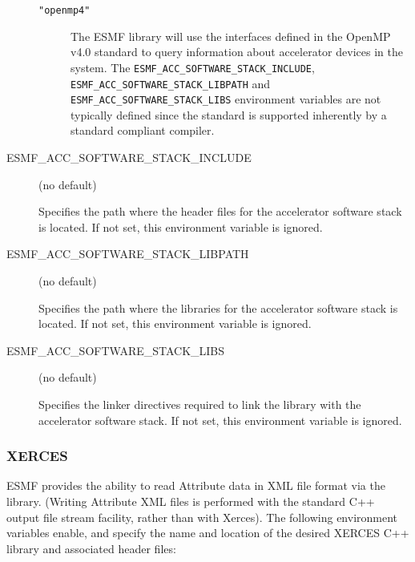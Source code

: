 \begin{description}
\begin{description}
\item[{\tt "openmp4"}] The ESMF library will use the interfaces defined
in the OpenMP v4.0 standard to query information about accelerator devices
in the system.
The {\tt ESMF\_ACC\_SOFTWARE\_STACK\_INCLUDE},
{\tt ESMF\_ACC\_SOFTWARE\_STACK\_LIBPATH} and
{\tt ESMF\_ACC\_SOFTWARE\_STACK\_LIBS} environment variables are not typically
defined since the standard is supported inherently by a standard compliant
compiler.

\end{description}

\item[ESMF\_ACC\_SOFTWARE\_STACK\_INCLUDE] (no default)

Specifies the path where the header files for the accelerator software
stack is located. If not set, this environment variable is ignored.

\item[ESMF\_ACC\_SOFTWARE\_STACK\_LIBPATH] (no default)

Specifies the path where the libraries for the accelerator software
stack is located. If not set, this environment variable is ignored.

\item[ESMF\_ACC\_SOFTWARE\_STACK\_LIBS] (no default)

Specifies the linker directives required to link the library with
the accelerator software stack. If not set, this environment variable
is ignored.

\end{description}


\subsubsection{XERCES}
\label{sec:xerces}
ESMF provides the ability to read Attribute data in XML file format
via the 
library.  (Writing Attribute XML files is performed with the standard C++
output file stream facility, rather than with Xerces).  The following
environment variables enable, and specify the name and location of the
desired XERCES C++ library and associated header files:

